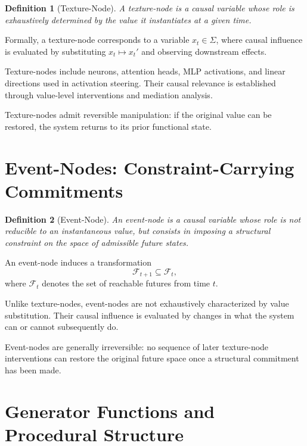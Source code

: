 \documentclass[11pt]{article}
\newtheorem{definition}{Definition}
\newcommand{\Fut}{\mathcal{F}}
\newcommand{\State}{\Sigma}
\begin{document}
\begin{definition}[Texture-Node]
A \emph{texture-node} is a causal variable whose role is exhaustively determined
by the value it instantiates at a given time.
\end{definition}

Formally, a texture-node corresponds to a variable \( x_t \in \State \), where
causal influence is evaluated by substituting \( x_t \mapsto x_t' \) and
observing downstream effects.

Texture-nodes include neurons, attention heads, MLP activations, and linear
directions used in activation steering. Their causal relevance is established
through value-level interventions and mediation analysis.

Texture-nodes admit reversible manipulation: if the original value can be
restored, the system returns to its prior functional state.

\section{Event-Nodes: Constraint-Carrying Commitments}

\begin{definition}[Event-Node]
An \emph{event-node} is a causal variable whose role is not reducible to an
instantaneous value, but consists in imposing a structural constraint on the
space of admissible future states.
\end{definition}

An event-node induces a transformation
\[
\Fut_{t+1} \subseteq \Fut_t,
\]
where \( \Fut_t \) denotes the set of reachable futures from time \( t \).

Unlike texture-nodes, event-nodes are not exhaustively characterized by value
substitution. Their causal influence is evaluated by changes in what the system
can or cannot subsequently do.

Event-nodes are generally irreversible: no sequence of later texture-node
interventions can restore the original future space once a structural
commitment has been made.

\section{Generator Functions and Procedural Structure}
\end{document}
